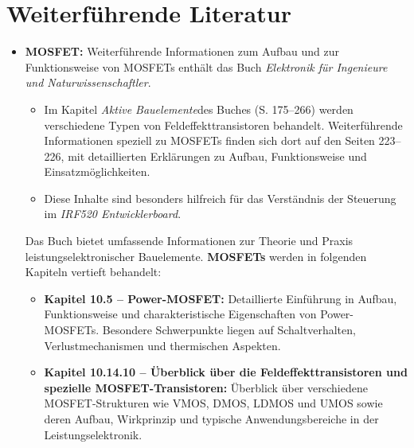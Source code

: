 {
	\label{Code:Test:File:TestApplicationMosfet}
}



\section{Weiterführende Literatur}
\begin{itemize}
	
	\item 	\textbf{MOSFET:}
	Weiterführende Informationen zum Aufbau und zur Funktionsweise von MOSFETs enthält das Buch 
	\glqq \textit{Elektronik für Ingenieure und Naturwissenschaftler}\grqq \cite{Hering.2021}. 
	
	\begin{itemize}
		\item Im Kapitel \glqq \textit{Aktive Bauelemente}\grqq des Buches (S. 175–266) werden verschiedene Typen von Feldeffekttransistoren behandelt. 
		Weiterführende Informationen speziell zu MOSFETs finden sich dort auf den Seiten 223–226, mit detaillierten Erklärungen zu Aufbau, Funktionsweise und Einsatzmöglichkeiten.
		\item Diese Inhalte sind besonders hilfreich für das Verständnis der Steuerung im \textit{IRF520 Entwicklerboard}.
	\end{itemize}
	
	Das Buch bietet umfassende Informationen zur Theorie und Praxis leistungselektronischer Bauelemente. 
	\textbf{MOSFETs} werden in folgenden Kapiteln vertieft behandelt:
	\begin{itemize}
		\item \textbf{Kapitel 10.5 – Power-MOSFET:} Detaillierte Einführung in Aufbau, Funktionsweise und charakteristische Eigenschaften von Power-MOSFETs. 
		Besondere Schwerpunkte liegen auf Schaltverhalten, Verlustmechanismen und thermischen Aspekten.
		\item \textbf{Kapitel 10.14.10 – Überblick über die Feldeffekttransistoren und spezielle MOSFET-Transistoren:} 
		Überblick über verschiedene MOSFET-Strukturen wie VMOS, DMOS, LDMOS und UMOS sowie deren Aufbau, Wirkprinzip und typische Anwendungsbereiche in der Leistungselektronik.
	\end{itemize}
	

\end{itemize}
